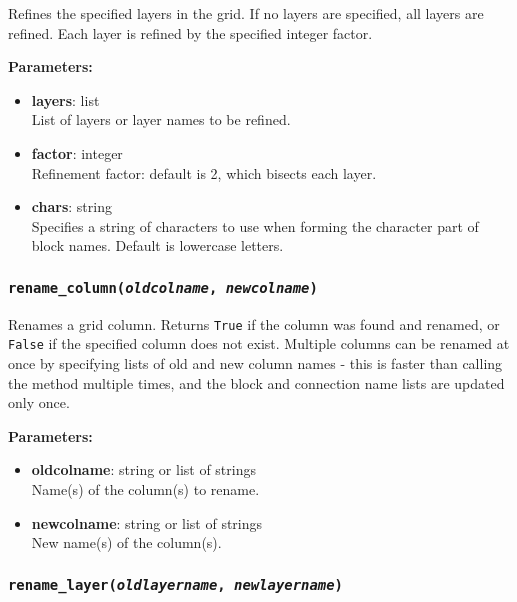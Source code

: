 Refines the specified layers in the grid.  If no layers are specified, all layers are refined.  Each layer is refined by the specified integer factor.

\textbf{Parameters:}
\begin{itemize}
  \item \textbf{layers}: list\\
    List of layers or layer names to be refined.
  \item \textbf{factor}: integer\\
    Refinement factor: default is 2, which bisects each layer.
  \item \textbf{chars}: string\\
    Specifies a string of characters to use when forming the character part of block names.  Default is lowercase letters.
\end{itemize}

\begin{snugshade}\subsubsection{\texttt{rename\_column(\emph{oldcolname}, \emph{newcolname})}}\end{snugshade}
\label{sec:mulgrid:rename_column}

Renames a grid column.  Returns \texttt{True} if the column was found and renamed, or \texttt{False} if the specified column does not exist.  Multiple columns can be renamed at once by specifying lists of old and new column names - this is faster than calling the method multiple times, and the block and connection name lists are updated only once.

\textbf{Parameters:}
\begin{itemize}
  \item \textbf{oldcolname}: string or list of strings\\
    Name(s) of the column(s) to rename.
  \item \textbf{newcolname}: string or list of strings\\
    New name(s) of the column(s).
\end{itemize}

\begin{snugshade}\subsubsection{\texttt{rename\_layer(\emph{oldlayername}, \emph{newlayername})}}\end{snugshade}
\label{sec:mulgrid:rename_layer}

